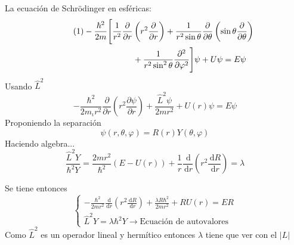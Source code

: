 \documentclass[10pt,twocolumn,titlepage]{article}
\newcommand\numberthis{\addtocounter{equation}{1}\tag{\theequation}}
\newcommand{\spartial}[2]{\frac{\partial #1}{\partial #2}}
\newcommand{\dpartial}[2]{\frac{\partial^2 #1}{\partial #2^2}}
\newcommand{\di}{\,\textrm{d}}
\newcommand{\nqm}{ m_{\iota} }
\begin{document}
La ecuación de Schrödinger en esféricas:
\begin{align*} \numberthis \label{schrod:esfericas}
-\frac{\hbar^2}{2m} \Bigg[  \frac{1}{r^2} \spartial{ }{r} &\left( r^2 \spartial{ }{r} \right)+ \frac{1}{r^2\sin\theta}\spartial{ }{\theta} \left( \sin\theta \spartial{ }{\theta}\right) \\
&+\frac{1}{r^2\sin^2\theta}\dpartial{}{\varphi}  \Bigg]\psi+U\psi=E\psi
\end{align*}
Usando $\hat{L}^2$
\begin{equation*}
-\frac{\hbar^2}{2\nqm r^2}\spartial{}{r}\left(r^2\spartial{\psi}{r} \right)+\frac{\hat{L}^2\psi}{2m r^2}+U(r)\psi =E\psi
\end{equation*}
Proponiendo la separación
\begin{equation} \label{psiry}
\psi(r,\theta,\varphi)=R(r)Y(\theta,\varphi)
\end{equation}
Haciendo algebra...
\begin{equation*}
\frac{\hat{L}^2Y}{\hbar^2Y}=\frac{2mr^2}{\hbar^2}\left(E-U(r)\right)+\frac{1}{r}\frac{\di}{\di r}\left(r^2\frac{\di R}{\di r} \right)=\lambda
\end{equation*}

Se tiene entonces
\[
\begin{cases}
-\frac{\hbar^2}{2mr^2}\frac{\di}{\di r}\left( r^2\frac{\di R}{\di r}\right)+\frac{\lambda R\hbar^2}{2mr^2}+RU(r)=ER \\
\hat{L}^2Y=\lambda \hbar^2 Y \rightarrow \text{Ecuación de autovalores}
\end{cases}
\]
Como $\hat{L}^2$ es un operador lineal y hermítico entonces $\lambda$ tiene que ver con el $|L|$
\end{document}
